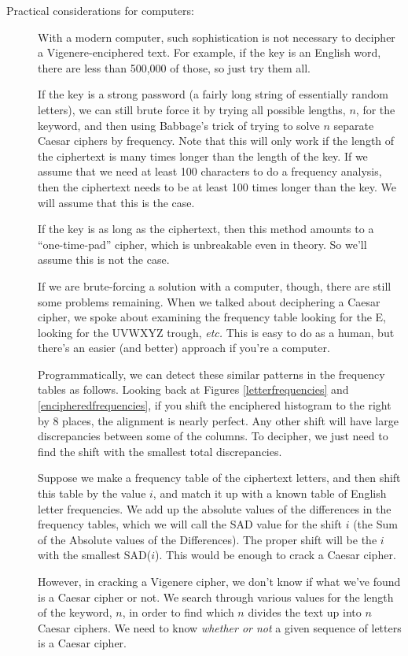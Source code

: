 \documentclass{article}
\begin{document}
\begin{description}
\item[Practical considerations for computers:] With a modern computer,
  such sophistication is not necessary to decipher a
  Vigenere-enciphered text.  For example, if the key is an English
  word, there are less than 500,000 of those, so just try them all.

  If the key is a strong password (a fairly long string of essentially
  random letters), we can still brute force it by trying all possible
  lengths, $n$, for the keyword, and then using Babbage's trick of
  trying to solve $n$ separate Caesar ciphers by frequency.  Note that
  this will only work if the length of the ciphertext is many times
  longer than the length of the key.  If we assume that we need at
  least 100 characters to do a frequency analysis, then the ciphertext
  needs to be at least 100 times longer than the key.  We will assume
  that this is the case.

  If the key is as long as the ciphertext, then this method amounts to
  a ``one-time-pad'' cipher, which is unbreakable even in theory.  So
  we'll assume this is not the case.

If we are brute-forcing a solution with a computer, though, there are
still some problems remaining.  When we talked about deciphering a
Caesar cipher, we spoke about examining the frequency table looking
for the E, looking for the UVWXYZ trough, {\em etc.}  This is easy to
do as a human, but there's an easier (and better) approach if you're a
computer.

Programmatically, we can detect these similar patterns in the
frequency tables as follows.  Looking back at Figures
\ref{letterfrequencies} and \ref{encipheredfrequencies}, if you shift
the enciphered histogram to the right by 8 places, the alignment is
nearly perfect.  Any other shift will have large discrepancies between
some of the columns.  To decipher, we just need to find the shift with
the smallest total discrepancies.

Suppose we make a frequency table of the ciphertext letters, and then
shift this table by the value $i$, and match it up with a known table
of English letter frequencies.  We add up the absolute values of the
differences in the frequency tables, which we will call the SAD value
for the shift $i$ (the Sum of the Absolute values of the Differences).
The proper shift will be the $i$ with the smallest SAD($i$).  This
would be enough to crack a Caesar cipher.

However, in cracking a Vigenere cipher, we don't know if what we've
found is a Caesar cipher or not.  We search through various values for
the length of the keyword, $n$, in order to find which $n$ divides the
text up into $n$ Caesar ciphers.  We need to know {\em whether or not}
a given sequence of letters is a Caesar cipher.


\end{description}
\end{document}
